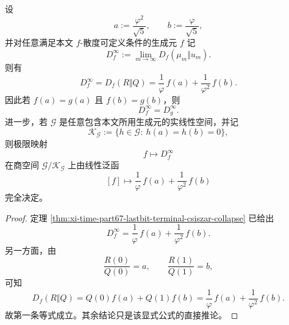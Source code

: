 \begin{corollary}\label{cor:xi-time-part9sa-fdiv-two-point-evaluation-closure}
设
\[
a:=\frac{\varphi^2}{\sqrt5},
\qquad
b:=\frac{\varphi}{\sqrt5},
\]
并对任意满足本文 \(f\)-散度可定义条件的生成元 \(f\) 记
\[
D_f^\infty:=\lim_{m\to\infty}D_f(\mu_m\Vert u_m).
\]
则有
\[
D_f^\infty
=
D_f(R\Vert Q)
=
\frac1\varphi\,f(a)+\frac1{\varphi^2}\,f(b).
\]
因此若 \(f(a)=g(a)\) 且 \(f(b)=g(b)\)，则
\[
D_f^\infty=D_g^\infty.
\]
进一步，若 \(\mathcal G\) 是任意包含本文所用生成元的实线性空间，并记
\[
\mathcal K_{\mathcal G}:=\{h\in\mathcal G:\ h(a)=h(b)=0\},
\]
则极限映射
\[
f\longmapsto D_f^\infty
\]
在商空间 \(\mathcal G/\mathcal K_{\mathcal G}\) 上由线性泛函
\[
[f]\longmapsto \frac1\varphi\,f(a)+\frac1{\varphi^2}\,f(b)
\]
完全决定。
\end{corollary}
\begin{proof}
定理 \ref{thm:xi-time-part67-lastbit-terminal-csiszar-collapse} 已给出
\[
D_f^\infty=\frac1\varphi\,f(a)+\frac1{\varphi^2}\,f(b).
\]
另一方面，由
\[
\frac{R(0)}{Q(0)}=a,
\qquad
\frac{R(1)}{Q(1)}=b,
\]
可知
\[
D_f(R\Vert Q)
=
Q(0)f(a)+Q(1)f(b)
=
\frac1\varphi\,f(a)+\frac1{\varphi^2}\,f(b).
\]
故第一条等式成立。其余结论只是该显式公式的直接推论。
\end{proof}

